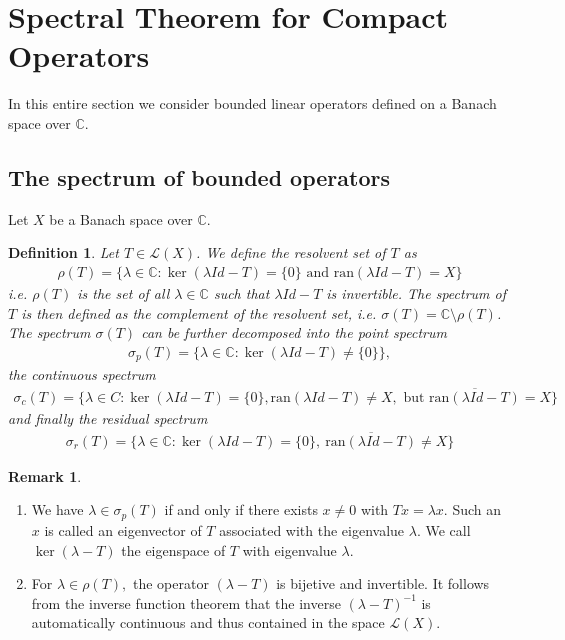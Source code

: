 \documentclass[11pt,a4paper]{article}
\newtheorem{defn}{Definition}[section]
\theoremstyle{definition}
\newtheorem{rem}{Remark}[section]
\begin{document}
\section{Spectral Theorem for Compact Operators}
In this entire section we consider bounded linear operators defined on a Banach space over $\mathbb{C}$.
\subsection{The spectrum of bounded operators}
Let $X$ be a Banach space over $\mathbb{C}$. 
\begin{defn} Let $T \in \mathcal{L}(X)$. We define the resolvent set of $T$ as 
\begin{align*}
\rho(T)= \lbrace \lambda \in \mathbb{C}: \ker( \lambda Id-T)= \lbrace 0 \rbrace \text{ and } \text{ran}( \lambda Id-T)=X \rbrace 
\end{align*}
i.e. $\rho(T)$ is the set of all $\lambda \in \mathbb{C}$ such that $ \lambda Id-T$ is invertible. The spectrum of $T$ is then defined as the complement of the resolvent set, i.e. $\sigma(T)= \mathbb{C} \setminus \rho(T)$. The spectrum $\sigma(T)$ can be further decomposed into the point spectrum 
\begin{align*}
\sigma_p(T)= \lbrace \lambda \in \mathbb{C}:  \ker( \lambda Id-T) \neq \lbrace 0 \rbrace \rbrace,
\end{align*}
the continuous spectrum 
\begin{align*}
\sigma_c(T)= \lbrace \lambda \in C : \ker( \lambda Id-T)= \lbrace 0 \rbrace, \text{ran}( \lambda Id-T) \neq X, \text{ but } \overline{\text{ran}(\lambda Id-T)}= X \rbrace 
\end{align*}
and finally the residual spectrum
\begin{align*}
\sigma_r(T)= \lbrace \lambda \in \mathbb{C}: \ker( \lambda Id-T)= \lbrace 0 \rbrace,\ \overline{\text{ran}(\lambda Id-T)} \neq X \rbrace 
\end{align*}
\end{defn}
\begin{rem} \ 
\begin{enumerate}
\item We have $\lambda \in \sigma_p(T)$ if and only if there exists $x \neq 0$ with $Tx= \lambda x$. Such an $x$ is called an eigenvector of $T$ associated with the eigenvalue $\lambda$. We call $\ker( \lambda-T)$ the eigenspace of $T$ with eigenvalue $\lambda$. 
\item For $\lambda \in \rho(T),$ the operator $( \lambda-T)$ is bijetive and invertible. It follows from the inverse function theorem that the inverse $( \lambda-T)^{-1}$ is automatically continuous and thus contained in the space $\mathcal{L}(X)$. 
\end{enumerate}
\end{rem}
\end{document}

